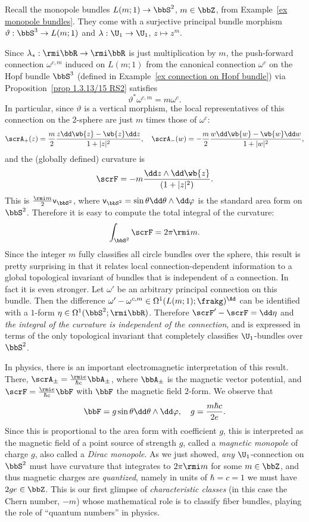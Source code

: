 \begin{example}\label{ex connection on monopole bundles}
    Recall the monopole bundles $L(m;1)\to \bbS^2$, $m\in\bbZ$, from Example~\ref{ex monopole bundles}. They come with a surjective principal bundle morphism $\vartheta:\bbS^3\to L(m;1)$ and $\lambda:\U_1\to \U_1$, $z\mapsto z^m$. 
    
    Since $\lambda_\ast:\rmi \bbR\to\rmi\bbR$ is just multiplication by $m$, the push-forward connection $\omega^{c,m}$ induced on $L(m;1)$ from the canonical connection $\omega^c$ on the Hopf bundle $\bbS^3$ (defined in Example~\ref{ex connection on Hopf bundle}) via Proposition~\ref{prop 1.3.13/15 RS2} satisfies
    \[\vartheta^\ast \omega^{c,m}=m \omega^c.\]
    In particular, since $\vartheta$ is a vertical morphism, the local representatives of this connection on the $2$-sphere are just $m$ times those of $\omega^c$:
    \[\scrA_+(z)=\frac{m}{2}\frac{z \dd \wb{z}-\wb{z}\dd z}{1+|z|^2},\quad \scrA_-(w)=-\frac{m}{2}\frac{w \dd \wb{w}-\wb{w}\dd w}{1+|w|^2},\]
    and the (globally defined) curvature is
    \[\scrF=-m\frac{\dd z\wedge\dd \wb{z}}{(1+|z|^2)}.\]
    This is $\frac{\rmi m}{2}\mathsf{v}_{\bbS^2}$, where $\mathsf{v}_{\bbS^2}=\sin\theta\dd\theta\wedge\dd\varphi$ is the standard area form on $\bbS^2$. Therefore it is easy to compute the total integral of the curvature:
    \[\int_{\bbS^2} \scrF =2\pi \rmi m.\]
    Since the integer $m$ fully classifies all circle bundles over the sphere, this result is pretty surprising in that it relates local connection-dependent information to a global topological invariant of bundles that is independent of a connection. In fact it is even stronger. Let $\omega'$ be an arbitrary principal connection on this bundle. Then the difference $\omega'-\omega^{c,m}\in\Omega^1(L(m;1);\frakg)^\Ad$ can be identified with a $1$-form $\eta\in\Omega^1(\bbS^2;\rmi \bbR)$. Therefore $\scrF'-\scrF=\dd \eta$ and \emph{the integral of the curvature is independent of the connection}, and is expressed in terms of the only topological invariant that completely classifies $\U_1$-bundles over $\bbS^2$.
    
    In physics, there is an important electromagnetic interpretation of this result. There, $\scrA_\pm=\frac{\rmi e}{\hbar c}\bbA_\pm$, where $\bbA_\pm$ is the magnetic vector potential, and $\scrF=\frac{\rmi e}{\hbar c} \bbF$ with $\bbF$ the magnetic field $2$-form. We observe that
    \[\bbF =g\sin\theta \dd\theta\wedge\dd\varphi,\quad g=\frac{m\hbar c}{2e}.\]
    Since this is proportional to the area form with coefficient $g$, this is interpreted as the magnetic field of a point source of strength $g$, called a \emph{magnetic monopole} of charge $g$, also called a \emph{Dirac monopole}. As we just showed, \emph{any} $\U_1$-connection on $\bbS^2$ must have curvature that integrates to $2\pi \rmi m$ for some $m\in \bbZ$, and thus magnetic charges are \emph{quantized}, namely in units of $\hbar=c=1$ we must have $2ge\in\bbZ$. This is our first glimpse of \emph{characteristic classes} (in this case the Chern number, $-m$) whose mathematical role is to classify fiber bundles,  playing the role of ``quantum numbers'' in physics.
\end{example}
